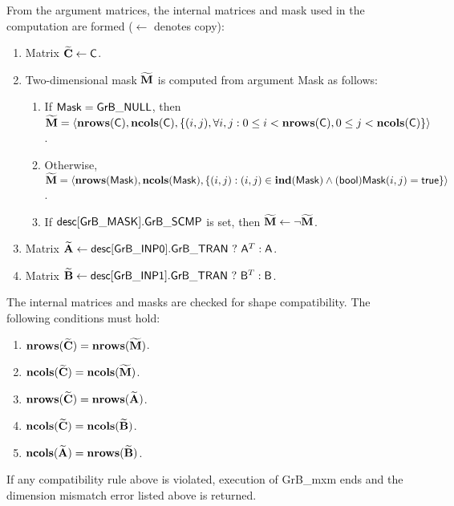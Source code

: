From the argument matrices, the internal matrices and mask used in the computation are formed ($\leftarrow$ denotes copy):
\begin{enumerate}

	\item Matrix ${\bf \widetilde{C}} \leftarrow {\sf C}$.

	\item Two-dimensional mask ${\bf \widetilde{M}}$ is computed from argument 
    {\sf Mask} as follows:
	\begin{enumerate}

		\item	If ${\sf Mask} = {\sf GrB\_NULL}$, then ${\bf \widetilde{M}} = 
        \langle \bold{nrows}({\sf C}), \bold{ncols}({\sf C}), \{(i,j), 
        \forall i,j : 0 \leq i <  \bold{nrows}({\sf C}), 0 \leq j < \bold{ncols}({\sf C}) 
        \} \rangle$.

		\item	Otherwise, ${\bf \widetilde{M}} = \langle \bold{nrows}({\sf Mask}), 
        \bold{ncols}({\sf Mask}), \{(i,j) : (i,j) \in \bold{ind}({\sf Mask}) \wedge 
        ({\sf bool}){\sf Mask}(i,j) = {\sf true}\} \rangle$.

		\item	If ${\sf desc[GrB\_MASK].GrB\_SCMP}$ is set, then 
        ${\bf \widetilde{M}} \leftarrow \neg {\bf \widetilde{M}}$.

	\end{enumerate}

	\item Matrix ${\bf \widetilde{A}} \leftarrow {\sf desc[GrB\_INP0].GrB\_TRAN} \ ? \ {\sf A}^T : {\sf A}$.

	\item Matrix ${\bf \widetilde{B}} \leftarrow {\sf desc[GrB\_INP1].GrB\_TRAN} \ ? \ {\sf B}^T : {\sf B}$.
\end{enumerate}

The internal matrices and masks are checked for shape compatibility. The following 
conditions must hold:
\begin{enumerate}
	\item $\bold{nrows}({\bf \widetilde{C}}) = \bold{nrows}({\bf \widetilde{M}})$.

	\item $\bold{ncols}({\bf \widetilde{C}}) = \bold{ncols}({\bf \widetilde{M}})$.

	\item $\bold{nrows}({\bf \widetilde{C}}) = \bold{nrows}({\bf \widetilde{A}})$.

	\item $\bold{ncols}({\bf \widetilde{C}}) = \bold{ncols}({\bf \widetilde{B}})$.

	\item $\bold{ncols}({\bf \widetilde{A}}) = \bold{nrows}({\bf \widetilde{B}})$.
\end{enumerate}
If any compatibility rule above is violated, execution of {\sf GrB\_mxm} ends and 
the dimension mismatch error listed above is returned.

